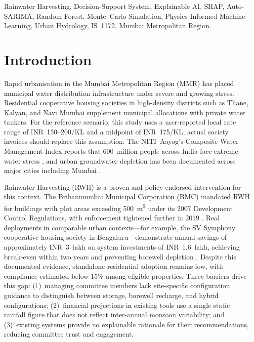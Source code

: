 ﻿\documentclass[conference]{IEEEtran}
\begin{document}
\begin{IEEEkeywords}
Rainwater Harvesting, Decision-Support System, Explainable AI, SHAP,
Auto-SARIMA, Random Forest, Monte~Carlo Simulation,
Physics-Informed Machine Learning, Urban Hydrology, IS~1172,
Mumbai Metropolitan Region.
\end{IEEEkeywords}

\section{Introduction}
\label{sec:intro}

Rapid urbanisation in the Mumbai Metropolitan Region (MMR) has placed municipal water distribution infrastructure under severe and growing stress. Residential cooperative housing societies in high-density districts such as Thane, Kalyan, and Navi Mumbai supplement municipal allocations with private water tankers. For the reference scenario, this study uses a user-reported local rate range of INR~150--200/KL and a midpoint of INR~175/KL; actual society invoices should replace this assumption. The NITI~Aayog's Composite Water Management Index reports that 600~million people across India face extreme water stress \cite{nitiAayog2018}, and urban groundwater depletion has been documented across major cities including Mumbai \cite{cgwb2022}.

Rainwater Harvesting (RWH) is a proven and policy-endorsed intervention for this context. The Brihanmumbai Municipal Corporation (BMC) mandated RWH for buildings with plot areas exceeding 500~m\textsuperscript{2} under its 2007 Development Control Regulations, with enforcement tightened further in 2019 \cite{mumbai2024}. Real deployments in comparable urban contexts---for example, the SV Symphony cooperative housing society in Bengaluru---demonstrate annual savings of approximately INR~3~lakh on system investments of INR~1.6~lakh, achieving break-even within two years and preventing borewell depletion \cite{bengaluru2019}. Despite this documented evidence, standalone residential adoption remains low, with compliance estimated below 15\% among eligible properties. Three barriers drive this gap: (1)~managing committee members lack site-specific configuration guidance to distinguish between storage, borewell recharge, and hybrid configurations; (2)~financial projections in existing tools use a single static rainfall figure that does not reflect inter-annual monsoon variability; and (3)~existing systems provide no explainable rationale for their recommendations, reducing committee trust and engagement.
\end{document}
